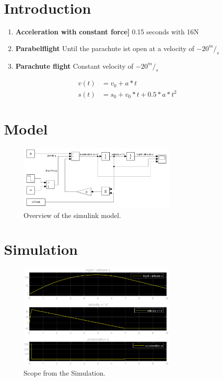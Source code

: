 %
%
%
\section{Introduction}

	\begin{enumerate}
		\item \textbf{Acceleration with constant force]} 0.15 seconds with 16N
		\item \textbf{Parabelflight} Until the parachute ist open at a velocity of $-20^m/_s$
		\item \textbf{Parachute flight} Constant velocity of $-20^m/_s$
	\end{enumerate}

	\begin{eqnarray}
		v\left( t\right)  &= v_0 + a * t\\
		s\left( t\right)  &= s_0 + v_0 * t + 0.5 * a * t^2
	\end{eqnarray}
	
	
	
	
\section{Model}


	\begin{figure}[H]
		\centering
		\includegraphics[width=0.7\textwidth]{figures/overview.png}
		\caption{Overview of the simulink model.}
		\label{fig:overview}
	\end{figure}


\section{Simulation}	
	
	\begin{figure}[H]
		\centering
		\includegraphics[width=0.7\textwidth]{figures/scope.eps}
		\caption{Scope from the Simulation.}
		\label{fig:scope1}
	\end{figure}
	
